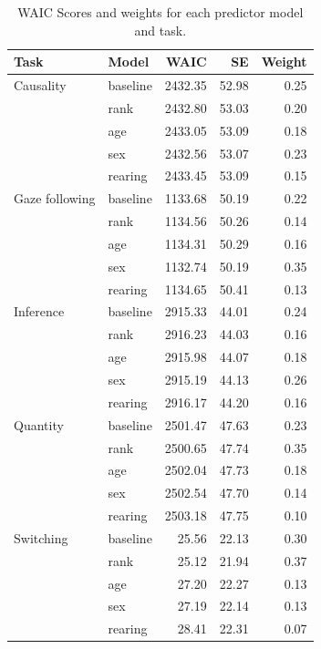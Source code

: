 \documentclass[10pt, letterpaper]{article}
\begin{document}
\begin{table}[H]
\centering
\begin{tabular}{llrrr}
  \hline
Task & Model & WAIC & SE & Weight \\ 
  \hline
Causality & baseline & 2432.35 & 52.98 & 0.25 \\ 
   & rank & 2432.80 & 53.03 & 0.20 \\ 
   & age & 2433.05 & 53.09 & 0.18 \\ 
   & sex & 2432.56 & 53.07 & 0.23 \\ 
   & rearing & 2433.45 & 53.09 & 0.15 \\ 
  Gaze following & baseline & 1133.68 & 50.19 & 0.22 \\ 
   & rank & 1134.56 & 50.26 & 0.14 \\ 
   & age & 1134.31 & 50.29 & 0.16 \\ 
   & sex & 1132.74 & 50.19 & 0.35 \\ 
   & rearing & 1134.65 & 50.41 & 0.13 \\ 
  Inference & baseline & 2915.33 & 44.01 & 0.24 \\ 
   & rank & 2916.23 & 44.03 & 0.16 \\ 
   & age & 2915.98 & 44.07 & 0.18 \\ 
   & sex & 2915.19 & 44.13 & 0.26 \\ 
   & rearing & 2916.17 & 44.20 & 0.16 \\ 
  Quantity & baseline & 2501.47 & 47.63 & 0.23 \\ 
   & rank & 2500.65 & 47.74 & 0.35 \\ 
   & age & 2502.04 & 47.73 & 0.18 \\ 
   & sex & 2502.54 & 47.70 & 0.14 \\ 
   & rearing & 2503.18 & 47.75 & 0.10 \\ 
  Switching & baseline & 25.56 & 22.13 & 0.30 \\ 
   & rank & 25.12 & 21.94 & 0.37 \\ 
   & age & 27.20 & 22.27 & 0.13 \\ 
   & sex & 27.19 & 22.14 & 0.13 \\ 
   & rearing & 28.41 & 22.31 & 0.07 \\ 
   \hline
\end{tabular}
\caption{WAIC Scores and weights for each predictor model and task.} 
\end{table}
\end{document}
